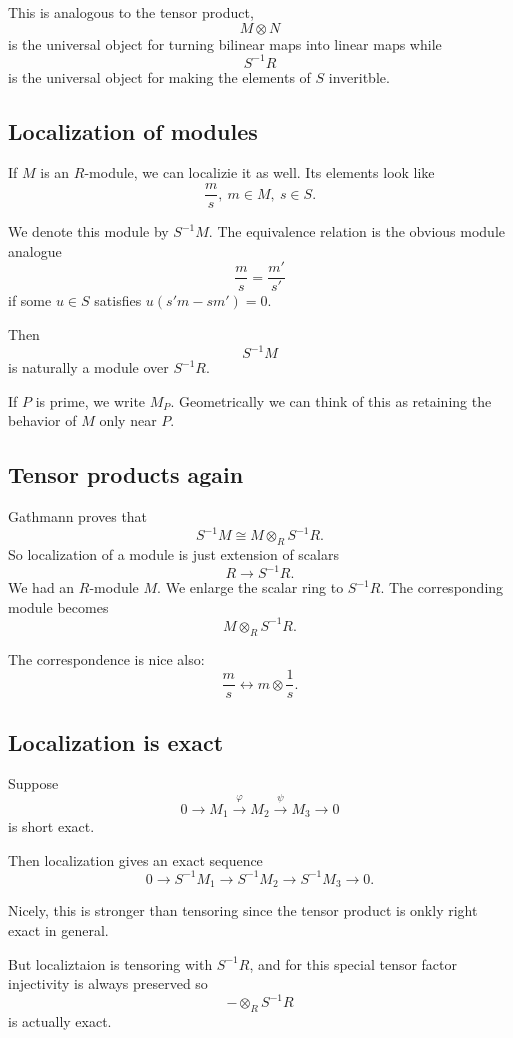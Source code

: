 \documentclass[11pt]{article}
\begin{document}
This is analogous to the tensor product, 
\[
    M \otimes N 
\]
is the universal object for turning bilinear maps into 
linear maps while 
\[
    S^{-1}R 
\]
is the universal object for making the elements of $S$ 
inveritble. 

\subsection{Localization of modules}
If $M$ is an $R$-module, we can localizie it as well. 
Its elements look like 
\[
    \frac{m}{s}, \ m \in M, \ s \in S. 
\]

We denote this module by $S^{-1}M$. 
The equivalence relation is the obvious module 
analogue 
\[
    \frac{m}{s} = \frac{m'}{s'} 
\]
if some $u \in S$ satisfies $u(s'm - sm') = 0$. 

Then
\[
    S^{-1}M 
\]
is naturally a module over $S^{-1}R$. 

If $P$ is prime, we write $M_P$. Geometrically 
we can think of this as retaining the behavior of $M$
only near $P$. 

\subsection{Tensor products again}

Gathmann proves that 
\[
    S^{-1}M \cong M \otimes_R S^{-1}R. 
\]
So localization of a module is just extension of 
scalars 
\[
    R \longrightarrow S^{-1}R. 
\]
We had an $R$-module $M$. We enlarge the scalar 
ring to $S^{-1}R$. 
The corresponding module becomes 
\[
    M \otimes_R S^{-1}R. 
\]

The correspondence is nice also: 
\[
    \frac{m}{s} \leftrightarrow m \otimes \frac{1}{s}.  
\]

\subsection{Localization is exact} 

Suppose 
\[
    0 \to M_1 \overset\varphi\to M_2 
    \overset\psi\to M_3 \to 0 
\]
is short exact. 

Then localization gives an exact sequence 
\[
    0 \to S^{-1}M_1 \to S^{-1}M_2 \to 
    S^{-1}M_3 \to 0. 
\]

Nicely, this is stronger than tensoring since 
the tensor product is onkly right exact in general. 

But localiztaion is tensoring with 
$S^{-1}R$, and for this special tensor factor 
injectivity is always preserved so 
\[
    - \otimes_R S^{-1}R 
\]
is actually exact. 
\end{document}

